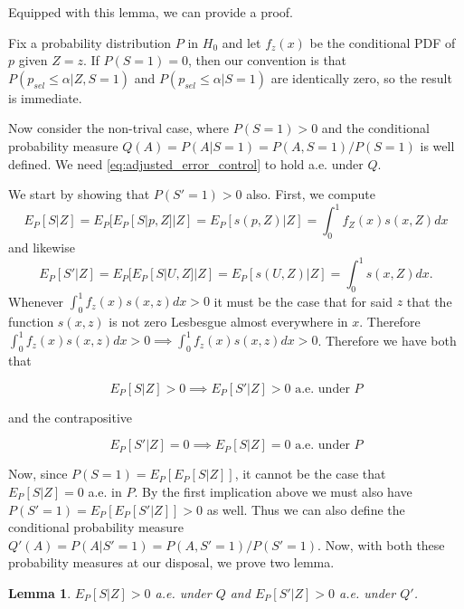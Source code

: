 \documentclass{article}
\newtheorem{lemma}{Lemma}
\begin{document}
\begin{appendix}
Equipped with this lemma, we can provide a proof. 

Fix a probability distribution $P$ in $H_0$ and let $f_z(x)$ be the conditional PDF of $p$ given $Z=z$. If $P(S=1) = 0$, then our convention is that $P(p_{sel} \leq \alpha | Z, S=1)$ and $P(p_{sel} \leq \alpha | S=1)$ are identically zero, so the result is immediate. 

Now consider the non-trival case, where $P(S=1) > 0$ and the conditional probability measure $Q(A)= P(A | S=1) = P(A, S=1)/P(S=1)$ is well defined. We need \eqref{eq:adjusted_error_control} to hold a.e. under $Q$. 

We start by showing that $P(S'=1) > 0$ also. First, we compute 
\begin{equation*}
    E_P[S | Z] = E_P[ E_P[S|p, Z]| Z] = E_P[s(p, Z)| Z] = \int_0^1 f_Z(x) s(x, Z) dx 
\end{equation*}
and likewise
\begin{equation*}
    E_P[S' | Z] = E_P[ E_P[S|U, Z]| Z] = E_P[s(U, Z)| Z] = \int_0^1 s(x, Z) dx. 
\end{equation*}
Whenever $\int_0^1 f_z(x) s(x, z) dx > 0$ it must be the case that for said $z$ that the function $s(x, z)$ is not zero Lesbesgue almost everywhere in $x$. Therefore $\int_0^1 f_z(x) s(x, z) dx > 0 \implies \int_0^1 f_z(x) s(x, z) dx > 0 $. Therefore we have both that 

\begin{equation*}
    E_P[S|Z] > 0 \implies E_P[S'| Z] > 0 \text{ a.e. under } P 
\end{equation*}

and the contrapositive

\begin{equation*}
    E_P[S'|Z] = 0 \implies E_P[S| Z] = 0 \text{ a.e. under } P 
\end{equation*}

Now, since $P(S = 1) = E_P[E_P[S| Z]]$, it cannot be the case that $E_P[S|Z] = 0$ a.e. in $P$.  By the first implication above we must also have $P(S' = 1) = E_P[E_P[S'| Z]] > 0$ as well. Thus we can also define the conditional probability measure $Q'(A) = P(A | S'=1) = P(A, S'=1)/P(S'=1)$. Now, with both these probability measures at our disposal, we prove two lemma. 

\begin{lemma}
    \label{lem:pos_selection}
    $E_P[S|Z]> 0$ a.e. under $Q$ and $E_P[S'|Z] > 0$ a.e. under $Q'$.
\end{lemma}


\end{appendix}
\end{document}
